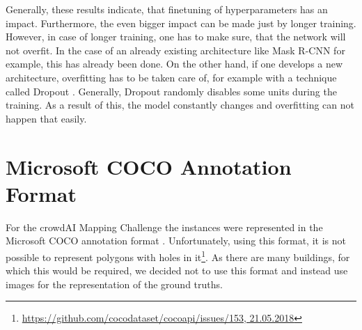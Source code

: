 Generally, these results indicate, that finetuning of hyperparameters has an impact. Furthermore, the even bigger impact can be made just by longer training. However, in case of longer training, one has to make sure, that the network will not overfit. In the case of an already existing architecture like Mask R-CNN for example, this has already been done. On the other hand, if one develops a new architecture, overfitting has to be taken care of, for example with a technique called Dropout \cite{Srivastava.2014}. Generally, Dropout randomly disables some units during the training. As a result of this, the model constantly changes and overfitting can not happen that easily.

\section{Microsoft COCO Annotation Format}
For the crowdAI Mapping Challenge \cite{mappingchallenge} the instances were represented in the Microsoft COCO annotation format \cite{cocoformat}. Unfortunately, using this format, it is not possible to represent polygons with holes in it\footnote{\url{https://github.com/cocodataset/cocoapi/issues/153, 21.05.2018}}. As there are many buildings, for which this would be required, we decided not to use this format and instead use images for the representation of the ground truths.


